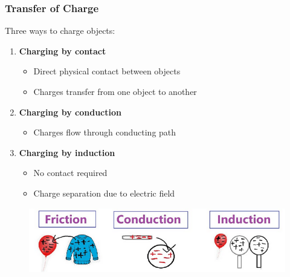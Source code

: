 \documentclass{beamer}
\begin{document}
\begin{frame}
    \frametitle{Transfer of Charge}
    Three ways to charge objects:
    \begin{enumerate}
        \item \textbf{Charging by contact}
            \begin{itemize}
                \item Direct physical contact between objects
                \item Charges transfer from one object to another
            \end{itemize}
        \item \textbf{Charging by conduction}
            \begin{itemize}
                \item Charges flow through conducting path
            \end{itemize}
        \item \textbf{Charging by induction}
            \begin{itemize}
                \item No contact required
                \item Charge separation due to electric field
            \end{itemize}
    \end{enumerate}
    
    
       \begin{figure}
           \centering
           \includegraphics[width=1\linewidth]{phys11-electrostatics-charging-methods.png}
       \end{figure}
    
\end{frame}
\end{document}
